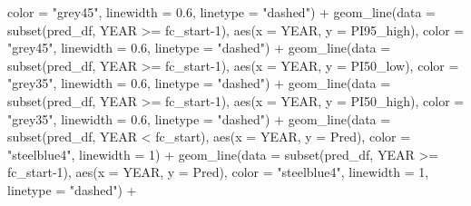 \documentclass[
  letterpaper,
  DIV=11,
  numbers=noendperiod]{scrreprt}
\newenvironment{Shaded}{\begin{snugshade}}{\end{snugshade}}
\newcommand{\AttributeTok}[1]{\textcolor[rgb]{0.40,0.45,0.13}{#1}}
\newcommand{\DecValTok}[1]{\textcolor[rgb]{0.68,0.00,0.00}{#1}}
\newcommand{\FloatTok}[1]{\textcolor[rgb]{0.68,0.00,0.00}{#1}}
\newcommand{\FunctionTok}[1]{\textcolor[rgb]{0.28,0.35,0.67}{#1}}
\newcommand{\NormalTok}[1]{\textcolor[rgb]{0.00,0.23,0.31}{#1}}
\newcommand{\SpecialCharTok}[1]{\textcolor[rgb]{0.37,0.37,0.37}{#1}}
\newcommand{\StringTok}[1]{\textcolor[rgb]{0.13,0.47,0.30}{#1}}
\begin{document}
\begin{Shaded}
\begin{Highlighting}[]
            \AttributeTok{color =} \StringTok{"grey45"}\NormalTok{, }\AttributeTok{linewidth =} \FloatTok{0.6}\NormalTok{, }\AttributeTok{linetype =} \StringTok{"dashed"}\NormalTok{) }\SpecialCharTok{+}
  \FunctionTok{geom\_line}\NormalTok{(}\AttributeTok{data =} \FunctionTok{subset}\NormalTok{(pred\_df, YEAR }\SpecialCharTok{\textgreater{}=}\NormalTok{ fc\_start}\DecValTok{{-}1}\NormalTok{), }\FunctionTok{aes}\NormalTok{(}\AttributeTok{x =}\NormalTok{ YEAR, }\AttributeTok{y =}\NormalTok{ PI95\_high),}
            \AttributeTok{color =} \StringTok{"grey45"}\NormalTok{, }\AttributeTok{linewidth =} \FloatTok{0.6}\NormalTok{, }\AttributeTok{linetype =} \StringTok{"dashed"}\NormalTok{) }\SpecialCharTok{+}
  \FunctionTok{geom\_line}\NormalTok{(}\AttributeTok{data =} \FunctionTok{subset}\NormalTok{(pred\_df, YEAR }\SpecialCharTok{\textgreater{}=}\NormalTok{ fc\_start}\DecValTok{{-}1}\NormalTok{), }\FunctionTok{aes}\NormalTok{(}\AttributeTok{x =}\NormalTok{ YEAR, }\AttributeTok{y =}\NormalTok{ PI50\_low),}
            \AttributeTok{color =} \StringTok{"grey35"}\NormalTok{, }\AttributeTok{linewidth =} \FloatTok{0.6}\NormalTok{, }\AttributeTok{linetype =} \StringTok{"dashed"}\NormalTok{) }\SpecialCharTok{+}
  \FunctionTok{geom\_line}\NormalTok{(}\AttributeTok{data =} \FunctionTok{subset}\NormalTok{(pred\_df, YEAR }\SpecialCharTok{\textgreater{}=}\NormalTok{ fc\_start}\DecValTok{{-}1}\NormalTok{), }\FunctionTok{aes}\NormalTok{(}\AttributeTok{x =}\NormalTok{ YEAR, }\AttributeTok{y =}\NormalTok{ PI50\_high),}
            \AttributeTok{color =} \StringTok{"grey35"}\NormalTok{, }\AttributeTok{linewidth =} \FloatTok{0.6}\NormalTok{, }\AttributeTok{linetype =} \StringTok{"dashed"}\NormalTok{) }\SpecialCharTok{+}
  \FunctionTok{geom\_line}\NormalTok{(}\AttributeTok{data =} \FunctionTok{subset}\NormalTok{(pred\_df, YEAR }\SpecialCharTok{\textless{}}\NormalTok{ fc\_start), }\FunctionTok{aes}\NormalTok{(}\AttributeTok{x =}\NormalTok{ YEAR, }\AttributeTok{y =}\NormalTok{ Pred),}
            \AttributeTok{color =} \StringTok{"steelblue4"}\NormalTok{, }\AttributeTok{linewidth =} \DecValTok{1}\NormalTok{) }\SpecialCharTok{+}
  \FunctionTok{geom\_line}\NormalTok{(}\AttributeTok{data =} \FunctionTok{subset}\NormalTok{(pred\_df, YEAR }\SpecialCharTok{\textgreater{}=}\NormalTok{ fc\_start}\DecValTok{{-}1}\NormalTok{), }\FunctionTok{aes}\NormalTok{(}\AttributeTok{x =}\NormalTok{ YEAR, }\AttributeTok{y =}\NormalTok{ Pred),}
            \AttributeTok{color =} \StringTok{"steelblue4"}\NormalTok{, }\AttributeTok{linewidth =} \DecValTok{1}\NormalTok{, }\AttributeTok{linetype =} \StringTok{"dashed"}\NormalTok{) }\SpecialCharTok{+}

\end{Highlighting}
\end{Shaded}
\end{document}
